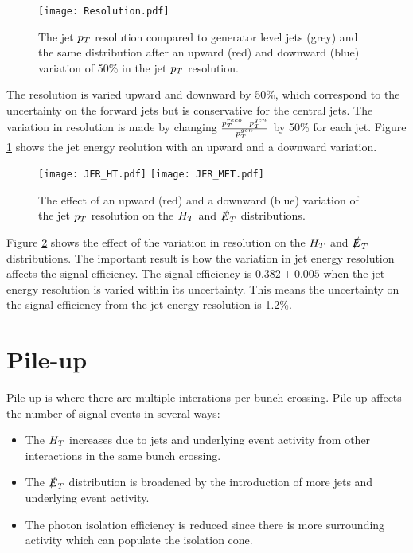 \begin{figure}
\begin{center}
\texttt{[image: Resolution.pdf]}
\end{center}
\caption{The jet $p_{T}$ resolution compared to generator level jets (grey) and
the same distribution after an upward (red) and downward (blue) 
variation of 50\unit{\%} in the jet $p_{T}$ resolution.}
\label{fig:Resolution}
\end{figure}

The resolution is varied upward and downward by 50\unit{\%}, which correspond to 
the uncertainty on the forward jets but is conservative for the central jets. 
The variation in resolution is made by changing $\frac{p_{T}^{reco} -
p_{T}^{gen}}{p_{T}^{gen}}$ by 50\unit{\%} for each jet. Figure \ref{fig:Resolution}
shows the jet energy reolution with an upward and a downward variation. \\

\begin{figure}
\texttt{[image: JER\_HT.pdf]}
\texttt{[image: JER\_MET.pdf]}
\caption{The effect of an upward (red) and a downward (blue) variation
of the jet $p_{T}$ resolution on the $H_{T}$ and $\slashed{E}_{T}$ distributions.}
\label{fig:JER}
\end{figure}

Figure \ref{fig:JER} shows the effect of the variation in resolution on the
$H_{T}$ and $\slashed{E}_{T}$ distributions. The important result is how the variation in jet 
energy resolution affects the signal efficiency. The signal efficiency is 
$0.382\pm0.005$ when the jet energy resolution is varied within its uncertainty. 
This means the uncertainty on the signal efficiency from the jet energy
resolution is 1.2\unit{\%}.

\section{Pile-up}

Pile-up is where there are multiple interations per bunch crossing. Pile-up 
affects the number of signal events in several ways:

\begin{itemize}
\item The $H_{T}$ increases due to jets and underlying event activity from other 
interactions in the same bunch crossing.
\item The $\slashed{E}_{T}$ distribution is broadened by the introduction of more jets and
underlying event activity.
\item The photon isolation efficiency is reduced since there is more 
surrounding activity which can populate the isolation cone.
\end{itemize}

